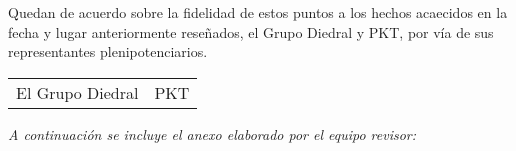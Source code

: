 \documentclass[twoside, a4paper, 11pt]{article}
\begin{document}
	\vspace*{1cm}

	Quedan de acuerdo sobre la fidelidad de estos puntos a los hechos acaecidos en la fecha y lugar anteriormente reseñados, el Grupo Diedral y PKT, por vía de sus representantes plenipotenciarios.\\

	\begin{tabularx}{.9\linewidth}{X  >{\raggedleft}X}
		El Grupo Diedral & PKT
	\end{tabularx}

	\vfill{}
	{\itshape A continuación se incluye el anexo elaborado por el equipo revisor:}

	
\end{document}

